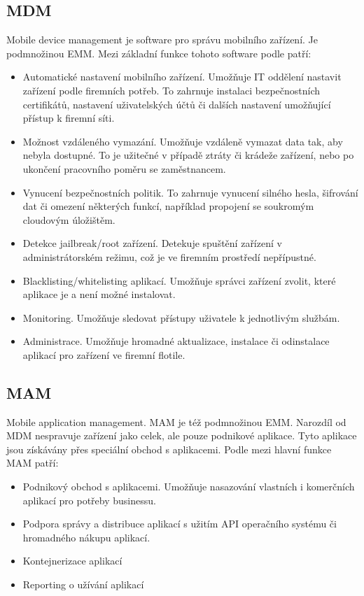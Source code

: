   \subsection{MDM}
 Mobile device management je software pro správu mobilního zařízení. Je podmnožinou EMM. Mezi základní funkce tohoto software podle \cite{systemOnline} patří:
 \begin{itemize}
     \item Automatické nastavení mobilního zařízení. Umožňuje IT oddělení nastavit zařízení podle firemních potřeb. To zahrnuje instalaci bezpečnostních certifikátů, nastavení uživatelských účtů či dalších nastavení umožňující přístup k firemní síti.
     \item Možnost vzdáleného vymazání. Umožňuje vzdáleně vymazat data tak, aby nebyla dostupné. To je užitečné v případě ztráty či krádeže zařízení, nebo po ukončení pracovního poměru se zaměstnancem.
     \item Vynucení bezpečnostních politik. To zahrnuje vynucení silného hesla, šifrování dat či omezení některých funkcí, například propojení se soukromým cloudovým úložištěm. 
     \item Detekce jailbreak/root zařízení. Detekuje spuštění zařízení v administrátorském režimu, což je ve firemním prostředí nepřípustné.
     \item Blacklisting/whitelisting aplikací. Umožňuje správci zařízení zvolit, které aplikace je a není možné instalovat.
     \item Monitoring. Umožňuje sledovat přístupy uživatele k jednotlivým službám.
     \item Administrace. Umožňuje hromadné aktualizace, instalace či odinstalace aplikací pro zařízení ve firemní flotile.
 \end{itemize}
 

 
 \subsection{MAM} 
 Mobile application management. MAM je též podmnožinou EMM. Narozdíl od MDM nespravuje zařízení jako celek, ale pouze podnikové aplikace. Tyto aplikace jsou získávány přes speciální obchod s aplikacemi. Podle \cite{MAMcitace} mezi hlavní funkce MAM patří:
 \begin{itemize}
     \item Podnikový obchod s aplikacemi. Umožňuje nasazování vlastních i komerčních aplikací pro potřeby businessu.
     \item Podpora správy a distribuce aplikací s užitím API operačního systému či hromadného nákupu aplikací.
     \item Kontejnerizace aplikací
     \item Reporting o užívání aplikací
 \end{itemize}
 
